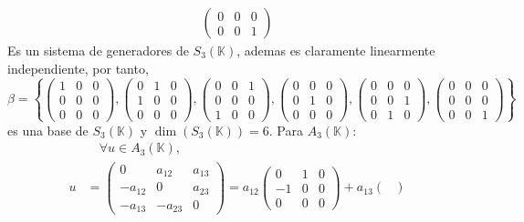 \begin{ejercicio}
\begin{align*}
\begin{pmatrix}
			0 & 0 & 0 \\
			0 & 0 & 1
		\end{pmatrix}
	\end{align*}
	Es un sistema de generadores de $S_3(\mathbb{K})$, ademas es claramente linearmente independiente, por tanto,  \\ $\beta = \left\{ \begin{pmatrix}
			1 & 0 & 0 \\
			0 & 0 & 0 \\
			0 & 0 & 0
		\end{pmatrix}, \begin{pmatrix}
			0 & 1 & 0 \\
			1 & 0 & 0 \\
			0 & 0 & 0
		\end{pmatrix}, \begin{pmatrix}
			0 & 0 & 1 \\
			0 & 0 & 0 \\
			1 & 0 & 0
		\end{pmatrix}, \begin{pmatrix}
			0 & 0 & 0 \\
			0 & 1 & 0 \\
			0 & 0 & 0
		\end{pmatrix}, \begin{pmatrix}
			0 & 0 & 0 \\
			0 & 0 & 1 \\
			0 & 1 & 0
		\end{pmatrix}, \begin{pmatrix}
			0 & 0 & 0 \\
			0 & 0 & 0 \\
			0 & 0 & 1
		\end{pmatrix} \right\}$ es una base de $S_3(\mathbb{K})$ y $\dim(S_3(\mathbb{K})) = 6$.
	Para $A_3(\mathbb{K})$:
	\begin{align*}
		 & \quad \forall u \in A_3(\mathbb{K}), \\ u &= \begin{pmatrix}
			0       & a_{12}  & a_{13} \\
			-a_{12} & 0       & a_{23} \\
			-a_{13} & -a_{23} & 0
		\end{pmatrix} = a_{12} \begin{pmatrix}
			0  & 1 & 0 \\
			-1 & 0 & 0 \\
			0  & 0 & 0
		\end{pmatrix} + a_{13} \begin{pmatrix}

\end{pmatrix}
\end{align*}
\end{ejercicio}
